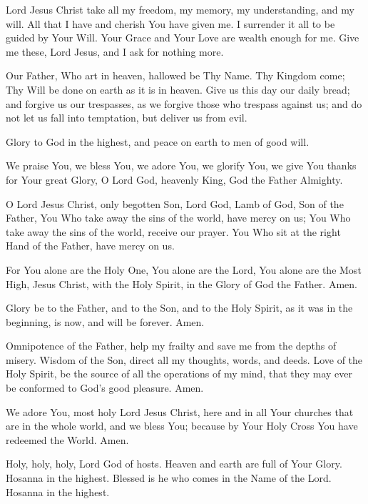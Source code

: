 Lord Jesus Christ take all my freedom, my memory, my understanding, and my will.
All that I have and cherish You have given me.
I surrender it all to be guided by Your Will.
Your Grace and Your Love are wealth enough for me.
Give me these, Lord Jesus, and I ask for nothing more.

Our Father, Who art in heaven, hallowed be Thy Name.
Thy Kingdom come;
Thy Will be done on earth as it is in heaven.
Give us this day our daily bread;
and forgive us our trespasses, as we forgive those who trespass against us;
and do not let us fall into temptation, but deliver us from evil.

\label{prayer:gloria}
Glory to God in the highest, and peace on earth to men of good will.

We praise You, we bless You, we adore You, we glorify You, we give You thanks for Your great Glory, O Lord God, heavenly King, God the Father Almighty.

O Lord Jesus Christ, only begotten Son, Lord God, Lamb of God, Son of the Father, You Who take away the sins of the world, have mercy on us;
You Who take away the sins of the world, receive our prayer.
You Who sit at the right Hand of the Father, have mercy on us.

For You alone are the Holy One, You alone are the Lord, You alone are the Most High, Jesus Christ, with the Holy Spirit, in the Glory of God the Father.
Amen.

\label{prayer:glory_be}
Glory be to the Father, and to the Son, and to the Holy Spirit, as it was in the beginning, is now, and will be forever.
Amen.

\label{prayer:Omnipotentia_Patris}
Omnipotence of the Father, help my frailty and save me from the depths of misery.
Wisdom of the Son, direct all my thoughts, words, and deeds.
Love of the Holy Spirit, be the source of all the operations of my mind, that they may ever be conformed to God's good pleasure.
Amen.

\label{prayer:adoramus_te}
We adore You, most holy Lord Jesus Christ, here and in all Your churches that are in the whole world, and we bless You;
because by Your Holy Cross You have redeemed the World.
Amen.

\label{prayer:sanctus}
Holy, holy, holy, Lord God of hosts.
Heaven and earth are full of Your Glory.
Hosanna in the highest.
Blessed is he who comes in the Name of the Lord.
Hosanna in the highest.

